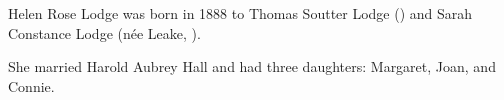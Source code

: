 
Helen Rose Lodge was born in  1888 to Thomas Soutter Lodge () and Sarah Constance Lodge (n\'{e}e Leake, ).

She married Harold Aubrey Hall and had three daughters: Margaret, Joan, and Connie.

\begin{references}


\end{references}
